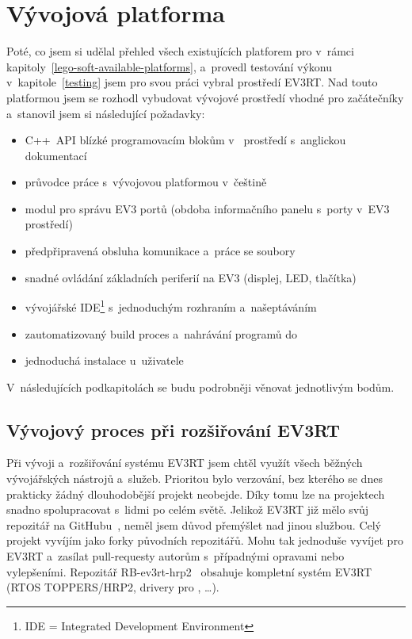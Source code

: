 \chapter{Vývojová platforma}

Poté, co jsem si udělal přehled všech existujících platforem pro \legoEV{} v~rámci kapitoly~\ref{lego-soft-available-platforms}, a~provedl testování výkonu v~kapitole~\ref{testing} jsem pro svou práci vybral prostředí EV3RT.
Nad touto platformou jsem se rozhodl vybudovat vývojové prostředí vhodné pro začátečníky a~stanovil jsem si následující požadavky:

\begin{itemize}
\item C++~API blízké programovacím blokům v~\lego{} prostředí s~anglickou dokumentací
\item průvodce práce s~vývojovou platformou v~češtině
\item modul pro správu EV3 portů (obdoba informačního panelu s~porty v~EV3 prostředí)  
\item předpřipravená obsluha komunikace a~práce se soubory
\item snadné ovládání základních periferií na EV3 (displej, LED, tlačítka)
\item vývojářské IDE\footnote{IDE = Integrated Development Environment} s~jednoduchým rozhraním a~našeptáváním 
\item zautomatizovaný build proces a~nahrávání programů do 
\item jednoduchá instalace u~uživatele
\end{itemize}
V~následujících podkapitolách se budu podrobněji věnovat jednotlivým bodům.


\section{Vývojový proces při rozšiřování EV3RT}

Při vývoji a~rozšiřování systému EV3RT jsem chtěl využít všech běžných vývojářských nástrojů a~služeb.
Prioritou bylo verzování, bez kterého se dnes prakticky žádný dlouhodobější projekt neobejde. Díky tomu lze na projektech snadno spolupracovat s~lidmi po celém světě.
Jelikož EV3RT již mělo svůj repozitář na GitHubu~\cite{legoProgramingPlatform_EV3RT-github}, neměl jsem důvod přemýšlet nad jinou službou.
Celý projekt vyvíjím jako forky původních repozitářů. Mohu tak jednoduše vyvíjet pro EV3RT a~zasílat pull-requesty autorům s~případnými opravami nebo vylepšeními.
Repozitář RB-ev3rt-hrp2~\cite{RB-ev3rt-hrp2-github} obsahuje kompletní systém EV3RT (RTOS TOPPERS/HRP2, drivery pro \brick{}, \dots). 


